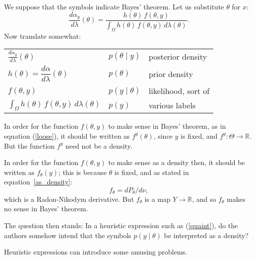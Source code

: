 \documentclass[
twoside=true,
paper=letter,
fontsize=9pt,
pagesize=auto,
leqno,
openany,
headsepline,
overfullrule,
]{scrbook}
\theoremstyle{plain}
\theoremstyle{plain}
\theoremstyle{definition}
\theoremstyle{bfnoteitalic}
\theoremstyle{bfnoteroman}
\newcommand{\R}{\mathbb{R}}
\newcommand{\funcf}{f}
\newcommand{\funch}{h}
\newcommand{\function}{f}
\newcommand{\measurespaceii}{Y}
\newcommand{\measnu}{\nu}
\newcommand{\measlambda}{\lambda}
\newcommand{\sspace}{\measurespaceii}%
\newcommand{\pspaceelt}{x}
\newcommand{\marginalone}{\alpha}%
\newcommand{\prior}{\marginalone}
\begin{document}
We suppose that the symbols indicate Bayes' theorem.
Let us substitute $\theta$ for $\pspaceelt$:
\begin{equation}\label{loose}
\frac{d \prior_y}{d\measlambda}(\theta)
=
\frac{\funch(\theta)\,\funcf(\theta,y)}
{\displaystyle
\int_{\Omega} \funch(\theta)\, \funcf(\theta,y)
\,d\measlambda(\theta)}.
\end{equation}
Now translate somewhat:
\begin{center}
\renewcommand{\arraystretch}{1.6}
\begin{tabular}{lll}
\toprule
$\displaystyle\frac{d \prior_y}{d\measlambda}(\theta)$ & $p(\theta\mid y)$ & posterior density \\
$\funch(\theta) = \dfrac{d\prior}{d\measlambda}(\theta)$
& $p(\theta)$ & prior density \\
$\funcf(\theta,y)$ & $p(y\mid\theta)$ & likelihood, sort of \\
$\int_{\Omega} \funch(\theta)\,\funcf(\theta,y)\,d\measlambda(\theta)$ & $p(y)$ & various labels \\
\bottomrule
\end{tabular}
\end{center}

In order for the function $\funcf(\theta,y)$ to  make sense in Bayes' theorem, as in equation (\ref{loose}), it should be written as $\funcf^y(\theta)$, since $y$ is fixed, and
$\funcf^y : \Theta \to \R$.
But the function $\funcf^y$ need not be a density.

In order for the function
$\funcf(\theta,y)$ to make sense as a density then, it should be written as $\funcf_\theta(y)$; this is because $\theta$ is fixed, and
as stated in equation~\ref{as_density}:
\[\function_\theta
=
d P_\theta/d\measnu,
\]
which is  a Radon-Nikodym derivative.
But $\function_\theta$ is a map $\sspace\to\R$, and so $\function_\theta$ makes no sense in Bayes' theorem.

The question then stands: In a heuristic expression such as (\ref{quaint}), do the authors  somehow intend that the symbols $p(y\mid\theta)$ be interpreted as a density?

Heuristic expressions can introduce some amusing problems.








\end{document}
